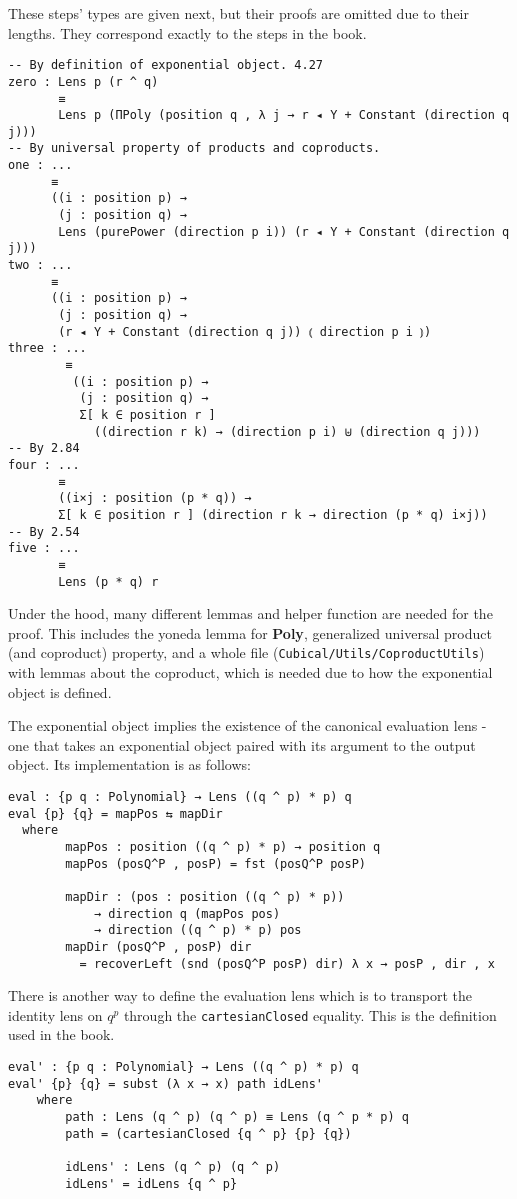 These steps' types are given next, but their proofs are omitted due to their lengths. They correspond exactly to the steps in the book.
\begin{verbatim}
-- By definition of exponential object. 4.27
zero : Lens p (r ^ q)
       ≡ 
       Lens p (ΠPoly (position q , λ j → r ◂ Y + Constant (direction q j)))
-- By universal property of products and coproducts.  
one : ...
      ≡ 
      ((i : position p) →
       (j : position q) → 
       Lens (purePower (direction p i)) (r ◂ Y + Constant (direction q j)))
two : ...
      ≡ 
      ((i : position p) →
       (j : position q) → 
       (r ◂ Y + Constant (direction q j)) ⦅ direction p i ⦆)
three : ...
        ≡
         ((i : position p) →
          (j : position q) → 
          Σ[ k ∈ position r ] 
            ((direction r k) → (direction p i) ⊎ (direction q j)))
-- By 2.84
four : ... 
       ≡
       ((i×j : position (p * q)) → 
       Σ[ k ∈ position r ] (direction r k → direction (p * q) i×j))
-- By 2.54
five : ...
       ≡
       Lens (p * q) r
\end{verbatim}

Under the hood, many different lemmas and helper function are needed for the proof. This includes the yoneda lemma for \textbf{Poly}, generalized universal product (and coproduct) property, and a whole file (\texttt{Cubical/Utils/CoproductUtils}) with lemmas about the coproduct, which is needed due to how the exponential object is defined. 

The exponential object implies the existence of the canonical evaluation lens - one that takes an exponential object paired with its argument to the output object. Its implementation is as follows:

\begin{verbatim}
eval : {p q : Polynomial} → Lens ((q ^ p) * p) q
eval {p} {q} = mapPos ⇆ mapDir
  where
        mapPos : position ((q ^ p) * p) → position q
        mapPos (posQ^P , posP) = fst (posQ^P posP)

        mapDir : (pos : position ((q ^ p) * p))
            → direction q (mapPos pos) 
            → direction ((q ^ p) * p) pos
        mapDir (posQ^P , posP) dir
          = recoverLeft (snd (posQ^P posP) dir) λ x → posP , dir , x
\end{verbatim}

There is another way to define the evaluation lens which is to transport the identity lens on $q^p$ through the \texttt{cartesianClosed} equality. 
This is the definition used in the book.
\begin{verbatim}
eval' : {p q : Polynomial} → Lens ((q ^ p) * p) q
eval' {p} {q} = subst (λ x → x) path idLens'
    where
        path : Lens (q ^ p) (q ^ p) ≡ Lens (q ^ p * p) q
        path = (cartesianClosed {q ^ p} {p} {q})

        idLens' : Lens (q ^ p) (q ^ p)
        idLens' = idLens {q ^ p}
\end{verbatim}

